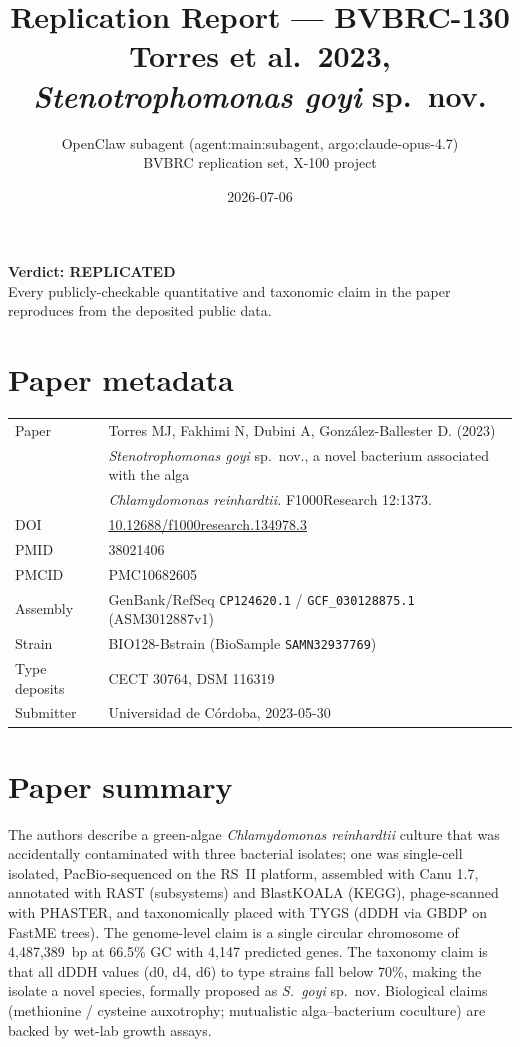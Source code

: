 \documentclass[11pt]{article}
\title{Replication Report --- BVBRC-130\\
       Torres et al.\ 2023, \emph{Stenotrophomonas goyi} sp.\ nov.}
\author{OpenClaw subagent (agent:main:subagent, argo:claude-opus-4.7)\\
        BVBRC replication set, X-100 project}
\date{2026-07-06}
\begin{document}
\maketitle

\begin{center}
\textbf{Verdict: REPLICATED}\\
{\small Every publicly-checkable quantitative and taxonomic claim in the paper reproduces from the deposited public data.}
\end{center}

\section{Paper metadata}
\begin{tabular}{ll}
\toprule
Paper & Torres MJ, Fakhimi N, Dubini A, Gonz\'alez-Ballester D. (2023)\\
& \emph{Stenotrophomonas goyi} sp.\ nov., a novel bacterium associated with the alga\\
& \emph{Chlamydomonas reinhardtii.} F1000Research 12:1373.\\
DOI & \href{https://doi.org/10.12688/f1000research.134978.3}{10.12688/f1000research.134978.3}\\
PMID & 38021406\\
PMCID & PMC10682605\\
Assembly & GenBank/RefSeq \texttt{CP124620.1} / \texttt{GCF\_030128875.1} (ASM3012887v1)\\
Strain & BIO128-Bstrain (BioSample \texttt{SAMN32937769})\\
Type deposits & CECT 30764, DSM 116319\\
Submitter & Universidad de C\'ordoba, 2023-05-30\\
\bottomrule
\end{tabular}

\section{Paper summary}
The authors describe a green-algae \emph{Chlamydomonas reinhardtii} culture that was
accidentally contaminated with three bacterial isolates; one was single-cell isolated,
PacBio-sequenced on the RS~II platform, assembled with Canu 1.7, annotated with RAST
(subsystems) and BlastKOALA (KEGG), phage-scanned with PHASTER, and taxonomically
placed with TYGS (dDDH via GBDP on FastME trees). The genome-level claim is a single
circular chromosome of 4{,}487{,}389~bp at 66.5\% GC with 4{,}147 predicted genes.
The taxonomy claim is that all dDDH values (d0, d4, d6) to type strains fall below
70\%, making the isolate a novel species, formally proposed as
\emph{S.~goyi} sp.~nov. Biological claims (methionine / cysteine auxotrophy;
mutualistic alga--bacterium coculture) are backed by wet-lab growth assays.
\end{document}
